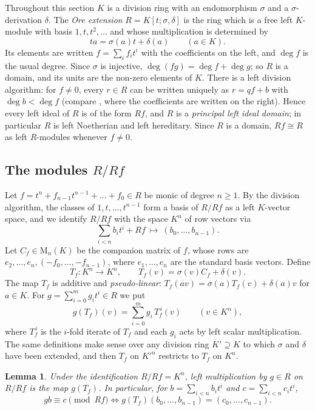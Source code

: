 \documentclass[11pt]{amsart}
\theoremstyle{plain}
\newtheorem{lemma}[theorem]{Lemma}
\theoremstyle{definition}
\theoremstyle{remark}
\newcommand{\M}{\mathrm M}
\begin{document}
Throughout this section $K$ is a division ring with an endomorphism $\sigma$ and a $\sigma$-derivation $\delta$. The \emph{Ore extension} $R=K[t;\sigma,\delta]$ is the ring which is a free left $K$-module with basis $1,t,t^2,\dots$ and whose multiplication is determined by
\[
ta=\sigma(a)t+\delta(a)\qquad(a\in K).
\]
Its elements are written $f=\sum_if_it^i$ with the coefficients on the left, and $\deg f$ is the usual degree. Since $\sigma$ is injective, $\deg(fg)=\deg f+\deg g$; so $R$ is a domain, and its units are the non-zero elements of $K$. There is a left division algorithm: for $f\ne0$, every $r\in R$ can be written uniquely as $r=qf+b$ with $\deg b<\deg f$ (compare \cite[Theorem~1.3.2]{CohFIR}, where the coefficients are written on the right). Hence every left ideal of $R$ is of the form $Rf$, and $R$ is a \emph{principal left ideal domain}; in particular $R$ is left Noetherian and left hereditary. Since $R$ is a domain, $Rf\cong R$ as left $R$-modules whenever $f\ne0$.

\subsection{The modules $R/Rf$}
Let $f=t^n+f_{n-1}t^{n-1}+\dots+f_0\in R$ be monic of degree $n\ge1$. By the division algorithm, the classes of $1,t,\dots,t^{n-1}$ form a basis of $R/Rf$ as a left $K$-vector space, and we identify $R/Rf$ with the space $K^n$ of row vectors via
\[
\sum_{i<n}b_it^i+Rf\ \longmapsto\ (b_0,\dots,b_{n-1}).
\]
Let $C_f\in\M_n(K)$ be the companion matrix of $f$, whose rows are $e_2,\dots,e_n,(-f_0,\dots,-f_{n-1})$, where $e_1,\dots,e_n$ are the standard basis vectors. Define
\[
T_f\colon K^n\to K^n,\qquad T_f(v)=\sigma(v)C_f+\delta(v).
\]
The map $T_f$ is additive and \emph{pseudo-linear}: $T_f(av)=\sigma(a)T_f(v)+\delta(a)v$ for $a\in K$. For $g=\sum_{i=0}^mg_it^i\in R$ we put
\[
g(T_f)(v)=\sum_{i=0}^mg_i\,T_f^{\,i}(v)\qquad(v\in K^n),
\]
where $T_f^{\,i}$ is the $i$-fold iterate of $T_f$ and each $g_i$ acts by left scalar multiplication. The same definitions make sense over any division ring $K'\supseteq K$ to which $\sigma$ and $\delta$ have been extended, and then $T_f$ on $K'^n$ restricts to $T_f$ on $K^n$.

\begin{lemma}\label{lem:action}
Under the identification $R/Rf=K^n$, left multiplication by $g\in R$ on $R/Rf$ is the map $g(T_f)$. In particular, for $b=\sum_{i<n}b_it^i$ and $c=\sum_{i<n}c_it^i$,
\[
gb\equiv c\pmod{Rf}\iff g(T_f)(b_0,\dots,b_{n-1})=(c_0,\dots,c_{n-1}).
\]
\end{lemma}
\end{document}
